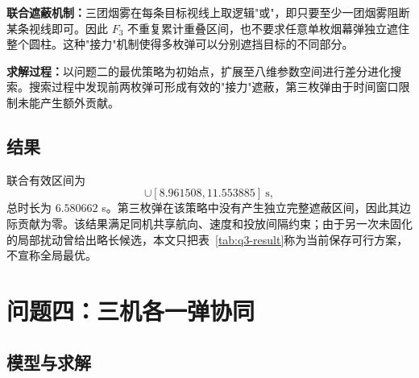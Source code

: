 \documentclass[12pt,a4paper]{article}
\begin{document}
\textbf{联合遮蔽机制：}三团烟雾在每条目标视线上取逻辑"或"，即只要至少一团烟雾阻断某条视线即可。因此 $F_3$ 不重复累计重叠区间，也不要求任意单枚烟幕弹独立遮住整个圆柱。这种"接力"机制使得多枚弹可以分别遮挡目标的不同部分。

\textbf{求解过程：}以问题二的最优策略为初始点，扩展至八维参数空间进行差分进化搜索。搜索过程中发现前两枚弹可形成有效的"接力"遮蔽，第三枚弹由于时间窗口限制未能产生额外贡献。

\subsection{结果}

\begin{table}[H]
\centering
\caption{问题三当前保存可行策略}
\label{tab:q3-result}
\end{table}

联合有效区间为
\begin{equation}
[4.952844,8.941512]\cup[8.961508,11.553885]\ \mathrm{s},
\end{equation}
总时长为 $6.580662$ s。第三枚弹在该策略中没有产生独立完整遮蔽区间，因此其边际贡献为零。该结果满足同机共享航向、速度和投放间隔约束；由于另一次未固化的局部扰动曾给出略长候选，本文只把表~\ref{tab:q3-result}称为当前保存可行方案，不宣称全局最优。

\section{问题四：三机各一弹协同}

\subsection{模型与求解}
\end{document}
